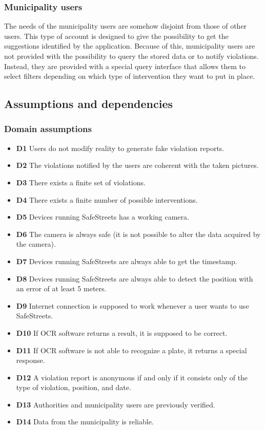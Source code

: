 \documentclass[./main.tex]{subfiles}
\begin{document}
\subsubsection{Municipality users}

The needs of the municipality users are somehow disjoint from those of
other users. This type of account is designed to give the possibility to
get the suggestions identified by the application. Because of this,
municipality users are not provided with the possibility to query the
stored data or to notify violations. Instead, they are provided with a
special query interface that allows them to select filters depending on
which type of intervention they want to put in place.

\subsection{Assumptions and dependencies}

\subsubsection{Domain assumptions}

\begin{itemize}
\item
  \textbf{D1} Users do not modify reality to generate fake violation
  reports.
\item
  \textbf{D2} The violations notified by the users are coherent with the
  taken pictures.
\item
  \textbf{D3} There exists a finite set of violations.
\item
  \textbf{D4} There exists a finite number of possible interventions.
\item
  \textbf{D5} Devices running SafeStreets has a working camera.
\item
  \textbf{D6} The camera is always safe (it is not possible to alter the
  data acquired by the camera).
\item
  \textbf{D7} Devices running SafeStreets are always able to get the
  timestamp.
\item
  \textbf{D8} Devices running SafeStreets are always able to detect the
  position with an error of at least 5 meters.
\item
  \textbf{D9} Internet connection is supposed to work whenever a user
  wants to use SafeStreets.
\item
  \textbf{D10} If OCR software returns a result, it is supposed to be
  correct.
\item
  \textbf{D11} If OCR software is not able to recognize a plate, it
  returns a special response.
\item
  \textbf{D12} A violation report is anonymous if and only if it
  consists only of the type of violation, position, and date.
\item
  \textbf{D13} Authorities and municipality users are previously
  verified.
\item
  \textbf{D14} Data from the municipality is reliable.
\end{itemize}
\end{document}

